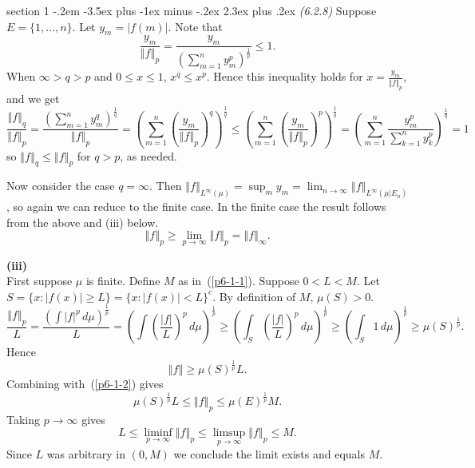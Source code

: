 \documentclass[12pt]{article}
\makeatletter
\theoremstyle{norm}
\newcommand{\rc}[1]{\frac{1}{#1}}
\newcommand{\pa}[1]{\left( {#1} \right)}
\newcommand{\ve}[1]{\left\Vert {#1}\right\Vert}
\newcommand{\subprob}[1]{\noindent\textbf{#1}\\}
\newcommand{\pf}[2]{\pa{\frac{#1}{#2}}}
\newcommand{\iy}[0]{\infty}
\newenvironment{problem}{\@startsection
       {section}
       {1}
       {-.2em}
       {-3.5ex plus -1ex minus -.2ex}
       {2.3ex plus .2ex}
       {\pagebreak[3]%
       \large\bf\noindent{Problem }
       }
       }
       {%
       }
\makeatother
\begin{document}
\begin{problem}{\it (6.2.8)}
Suppose $E=\{1,\ldots, n\}$. Let $y_m=|f(m)|$. Note that 
\[
\frac{y_m}{\ve{f}_p}=\frac{y_m}{\pa{\sum_{m=1}^n y_m^p}^{\rc p}}\le 1.
\]
When $\iy>q>p$ and $0\le x\le 1$, $x^q\le x^p$. Hence this inequality holds for $x=\frac{y_m}{\ve{f}_p}$, and we get
\[
\frac{\ve{f}_q}{\ve{f}_p}=\frac{\pa{\sum_{m=1}^n y_m^q}^{\rc q}}{\ve f_p}=\pa{\sum_{m=1}^n \pf{y_m}{\ve f_p}^q}^{\rc q}
\le\pa{\sum_{m=1}^n \pf{y_m}{\ve f_p}^p}^{\rc q}
=\pa{\sum_{m=1}^n \frac{y_m^p}{\sum_{k=1}^n y_k^p}}^{\rc q}=1
\]
so $\ve{f}_q\le \ve{f}_p$ for $q>p$, as needed.

Now consider the case $q=\iy$. Then $\ve{f}_{L^{\iy}(\mu)}=\sup_my_m=\lim_{n\to \iy}\ve{f}_{L^{\iy}(\mu|E_n)}$, so again we can reduce to the finite case. %
In the finite case the result follows from the above and (iii) below.
\[
\ve{f}_p\ge \lim_{p\to \iy} \ve{f}_p=
\ve{f}_{\iy}.
\]

\subprob{(iii)} 
First suppose $\mu$ is finite. 
Define $M$ as in~(\ref{p6-1-1}).
Suppose $0<L<M$. Let $S=\{x:|f(x)|\ge L\}=\{x:|f(x)|<L\}^c$. By definition of $M$, $\mu(S)>0$.
\[
\frac{\ve{f}_p}{L}=
\frac{\pa{\int |f|^p\,d\mu}^{\rc p}}{L}=\pa{\int \pf{|f|}{L}^p\,d\mu}^{\rc p}\ge
\pa{\int_S\pf{|f|}{L}^p\,d\mu}^{\rc p}\ge 
\pa{\int_S1\,d\mu}^{\rc p}\ge\mu(S)^{\rc p}.
\]
Hence
\[
\ve{f}\ge\mu(S)^{\rc p}L.
\]
Combining with~(\ref{p6-1-2}) gives
\[
\mu(S)^{\rc p}L\le \ve{f}_p\le \mu(E)^{\rc p}M.
\]
Taking $p\to \iy$ gives
\[
L\le\liminf_{p\to \iy} \ve{f}_p\le \limsup_{p\to \iy} \ve{f}_p\le M.
\]
Since $L$ was arbitrary in $(0,M)$ we conclude the limit exists and equals $M$.\\


\end{problem}
\end{document}
